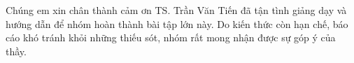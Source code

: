 \documentclass[a4paper]{article}
\begin{document}
Chúng em xin chân thành cảm ơn TS. Trần Văn Tiến đã tận tình giảng dạy và hướng dẫn để nhóm hoàn thành bài tập lớn này. Do kiến thức còn hạn chế, báo cáo khó tránh khỏi những thiếu sót, nhóm rất mong nhận được sự góp ý của thầy.

\newpage


\newpage

\newpage

\newpage

\newpage

\nocite{serway2008physics}
\nocite{halliday2013fundamentals}
\nocite{sympy_docs}
\nocite{taylor2005classical}
\nocite{kleppner2014introduction}



\newpage
\appendix

\end{document}
